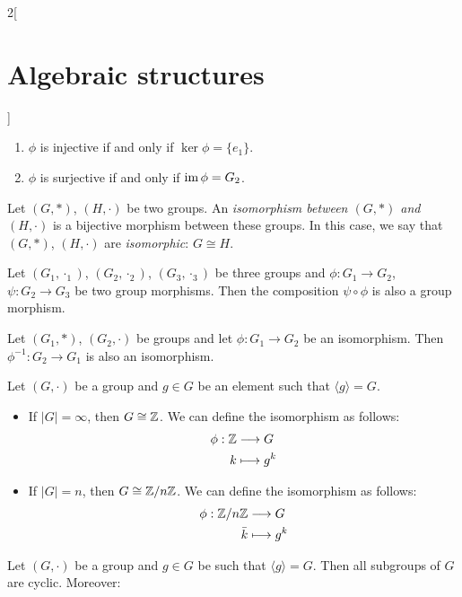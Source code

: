 \documentclass[../../../main.tex]{subfiles}
\begin{document}
\begin{multicols}{2}[\section{Algebraic structures}]
\begin{prop}
\begin{enumerate}
\begin{enumerate}
            \end{enumerate}
      \item $\phi$ is injective if and only if $\ker\phi=\{e_1\}$.
      \item $\phi$ is surjective if and only if $\operatorname{im}\phi=G_2$.
    \end{enumerate}
  \end{prop}
  \begin{definition}
    Let $(G,*)$, $(H,\cdot)$ be two groups. An \textit{isomorphism between $(G,*)$ and $(H,\cdot)$} is a bijective morphism between these groups. In this case, we say that $(G,*)$, $(H,\cdot)$ are \textit{isomorphic}: $G\cong H$.
  \end{definition}
  \begin{prop}
    Let $(G_1,\cdot_1)$, $(G_2,\cdot_2)$, $(G_3,\cdot_3)$ be three groups and $\phi:G_1\rightarrow G_2$, $\psi:G_2\rightarrow G_3$ be two group morphisms. Then the composition $\psi\circ\phi$ is also a group morphism.
  \end{prop}
  \begin{prop}
    Let $(G_1,*)$, $(G_2,\cdot)$ be groups and let $\phi: G_1\rightarrow G_2$ be an isomorphism. Then $\phi^{-1}: G_2\rightarrow G_1$ is also an isomorphism.
  \end{prop}
  \begin{theorem}
    Let $(G,\cdot)$ be a group and $g\in G$ be an element such that $\langle g\rangle=G$.
    \begin{itemize}
      \item If $|G|=\infty$, then $G\cong\mathbb{Z} $. We can define the isomorphism as follows:
            \begin{align*}
              \phi:\mathbb{Z} & \longrightarrow G \\
              k        & \longmapsto g^k
            \end{align*}
      \item If $|G|=n$, then $G\cong\mathbb{Z} /n\mathbb{Z} $. We can define the isomorphism as follows:
            \begin{align*}
              \phi:\mathbb{Z} /n\mathbb{Z} & \longrightarrow G \\
              \Bar{k}        & \longmapsto g^k
            \end{align*}
    \end{itemize}
  \end{theorem}
  \begin{corollary}
    Let $(G,\cdot)$ be a group and $g\in G$ be such that $\langle g\rangle=G$. Then all subgroups of $G$ are cyclic. Moreover:

\end{corollary}
\end{multicols}
\end{document}
